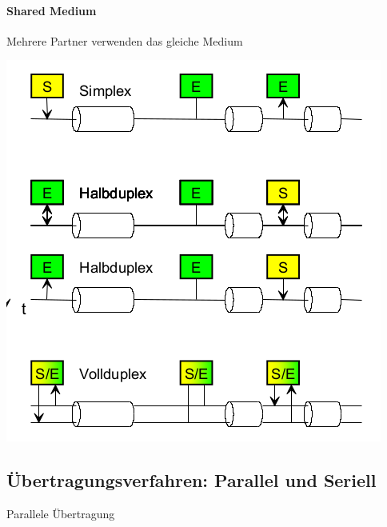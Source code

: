 \paragraph{Shared Medium }{
    {Mehrere Partner verwenden das gleiche Medium   \\}

    \includegraphics[scale=.35]{img/kopplung_2.png}

}


\subsection{Übertragungsverfahren: Parallel und Seriell}
{Parallele Übertragung}


